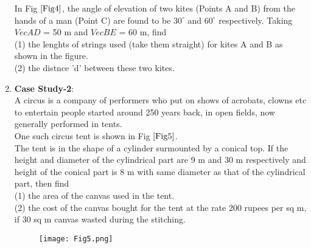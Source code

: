 \begin{enumerate}[\arabic*]
        
        In Fig $\ref{Fig4}$, the angle of elevation of two kites (Points A and B) from the hands of a man (Point C) are found to be $30^\circ$ and $60^\circ$ respectively. Taking $Vec{AD}$ = 50 m and $Vec{BE}$ = 60 m, find \\
        
        (1) the lenghts of strings used (take them straight) for kites A and B as shown in the figure.\\
        
        
        (2) the distnce 'd' between these two kites. \\
   
   
\item \textbf{Case Study-2}: \\  
   
      
          A circus is a company of performers who put on shows of acrobats, clowns etc to entertain people started around 250 years back, in open fields, now generally performed in tents. \\
          
          
          One such circus tent is shown in Fig $\ref{Fig5}$.   \\
          
          
     
     The tent is in the shape of a cylinder surmounted by a conical top. If the height and diameter of the cylindrical part are 9 m and 30 m respectively and height of the conical part is 8 m with same diameter as that of the cylindrical part, then find \\
     
     (1) the area of the canvas used in the tent. \\
     (2) the cost of the canvas bought for the tent at the rate 200 rupees          per sq m, if 30 sq m canvas wasted during the stitching. \\
     
     \begin{figure}[h!]
       \centering
        \texttt{[image: Fig5.png]}
    	\caption{}
    	\label{Fig5}
     \end{figure} 
        
    \end{enumerate}
    

